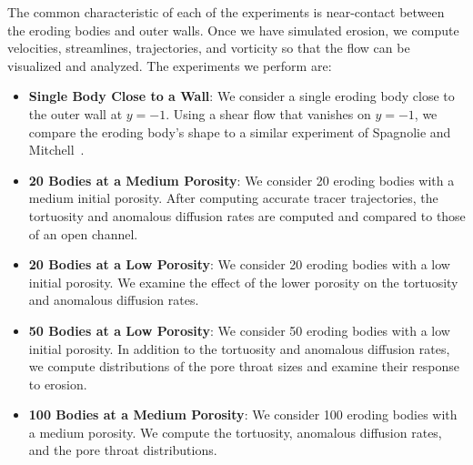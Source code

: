 \documentclass[preprint, 10pt]{elsarticle}
\begin{document}
The common characteristic of each of the experiments is near-contact
between the eroding bodies and outer walls. Once we have simulated
erosion, we compute velocities, streamlines, trajectories, and vorticity
so that the flow can be visualized and analyzed.  The experiments we
perform are:
\begin{itemize}
  \item{\bf Single Body Close to a Wall}: We consider a single eroding
  body close to the outer wall at $y=-1$.  Using a shear flow that
  vanishes on $y=-1$, we compare the eroding body's shape to a similar
  experiment of Spagnolie and Mitchell~\cite{mit-spa2017}.

  \item{\bf 20 Bodies at a Medium Porosity}: We consider 20 eroding
  bodies with a medium initial porosity.  After computing accurate
  tracer trajectories, the tortuosity and anomalous diffusion rates are
  computed and compared to those of an open channel.

  \item{\bf 20 Bodies at a Low Porosity}: We consider 20 eroding bodies
  with a low initial porosity.  We examine the effect of the lower
  porosity on the tortuosity and anomalous diffusion rates.

  \item{\bf 50 Bodies at a Low Porosity}: We consider 50 eroding bodies
  with a low initial porosity.  In addition to the tortuosity and
  anomalous diffusion rates, we compute distributions of the pore throat
  sizes and examine their response to erosion.

  \item{\bf 100 Bodies at a Medium Porosity}: We consider 100 eroding
  bodies with a medium porosity.  We compute the tortuosity, anomalous
  diffusion rates, and the pore throat distributions.
\end{itemize}


\end{document}
